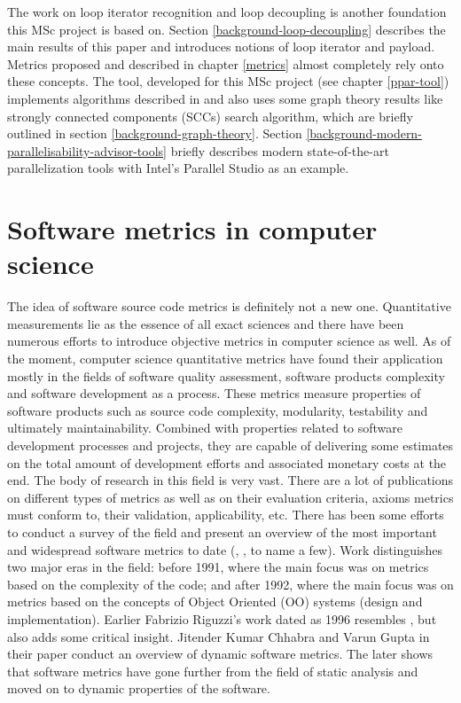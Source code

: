 \null\qquad The work on loop iterator recognition  and loop decoupling \cite{iterator-recognition-paper} is another foundation this MSc project is based on. Section \ref{background-loop-decoupling} describes the main results of this paper and introduces notions of loop iterator and payload. Metrics proposed and described in chapter \ref{metrics} almost completely rely onto these concepts. The tool, developed for this MSc project (see chapter \ref{ppar-tool}) implements algorithms described in \cite{iterator-recognition-paper} and also uses some graph theory results like strongly connected components (SCCs) search algorithm, which are briefly outlined in section \ref{background-graph-theory}.\newline
\null\qquad Section \ref{background-modern-parallelisability-advisor-tools} briefly describes modern state-of-the-art parallelization tools with Intel's Parallel Studio \cite{intel-parallel-studio} as an example.

\section{Software metrics in computer science} \label{background-software-metrics-in-cs}
\qquad The idea of software source code metrics is definitely not a new one. Quantitative measurements lie as the essence of all exact sciences and there have been numerous efforts to introduce objective metrics in computer science as well. As of the moment, computer science quantitative metrics have found their application mostly in the fields of software quality assessment, software products complexity and software development as a process. These metrics measure
properties of software products such as source code complexity, modularity,
testability and ultimately maintainability. Combined with properties related to
software development processes and projects, they are capable of delivering some
estimates on the total amount of development efforts and associated monetary costs at the end.\newline 
\null\qquad The body of research in this field is very vast. There are a lot of publications on different types of metrics as well as on their evaluation criteria, axioms metrics must conform to, their validation, applicability, etc. There has been some efforts to conduct a survey of the field and present an overview of the most important and widespread software metrics to date (\cite{metrics-survey-0-paper}, \cite{metrics-survey-1-paper}, \cite{metrics-survey-dynamic-paper} to name a few). Work \cite{metrics-survey-1-paper} distinguishes two major eras in the field: before 1991, where the main focus was on metrics based on the complexity of the code; and after 1992, where the main focus was on metrics based on the concepts of Object Oriented (OO) systems (design and implementation). Earlier Fabrizio Riguzzi's work \cite{metrics-survey-0-paper} dated as 1996 resembles \cite{metrics-survey-1-paper}, but also adds some critical insight. Jitender Kumar Chhabra and Varun Gupta in their paper \cite{metrics-survey-dynamic-paper} conduct an overview of dynamic software metrics. The later shows that software metrics have gone further from the field of static analysis and moved on to dynamic properties of the software.

